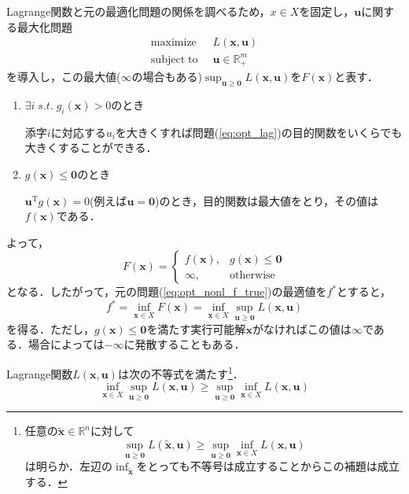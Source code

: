 \documentclass{jsreport}
\begin{document}
Lagrange関数と元の最適化問題の関係を調べるため，$x \in X$を固定し，$\bm{u}$に関する最大化問題
\begin{align}\label{eq:opt_lag}
  \mathrm{maximize} \; \; &L(\bm{x}, \bm{u}) \nonumber \\
  \mathrm{subject \; to} \; \; &\bm{u} \in \mathbb{R}_{+}^m
\end{align}
を導入し，この最大値($\infty$の場合もある)$\sup_{\bm{u} \geq \bm{0}} L(\bm{x}, \bm{u})$を$F(\bm{x})$と表す．
\begin{enumerate}
  \item $\exists i \; s.t. \; g_i(\bm{x}) > 0$のとき

  添字$i$に対応する$u_i$を大きくすれば問題(\ref{eq:opt_lag})の目的関数をいくらでも大きくすることができる．
  \item $g(\bm{x}) \leq \bm{0}$のとき

  $\bm{u}^{\mathrm{T}}g(\bm{x}) = 0$(例えば$\bm{u} = \bm{0}$)のとき，目的関数は最大値をとり，その値は$f(\bm{x})$である．
\end{enumerate}
よって，
\begin{equation}
  F(\bm{x}) = \begin{cases}
    f(\bm{x}), & g(\bm{x}) \leq \bm{0} \\
    \infty,        & \mathrm{otherwise}
\end{cases} \nonumber
\end{equation}
となる．したがって，元の問題(\ref{eq:opt_nonl_f_true})の最適値を$f^{*}$とすると，
\begin{equation}
  f^{*} = \inf_{\bm{x} \in X} F(\bm{x}) = \inf_{\bm{x} \in X} \sup_{\bm{u} \geq \bm{0}} L(\bm{x}, \bm{u}) \nonumber
\end{equation}
を得る．ただし，$g(\bm{x}) \leq \bm{0}$を満たす実行可能解$\bm{x}$がなければこの値は$\infty$である．場合によっては$-\infty$に発散することもある．

\begin{lemm}\label{lemm:infsup}
  Lagrange関数$L(\bm{x}, \bm{u})$は次の不等式を満たす\footnote{
  任意の$\tilde{\bm{x}} \in \mathbb{R}^n$に対して
  \begin{equation}
    \sup_{\bm{u} \geq \bm{0}} L(\tilde{\bm{x}}, \bm{u}) \geq \sup_{\bm{u} \geq \bm{0}} \inf_{\bm{x} \in X} L(\bm{x}, \bm{u}) \nonumber
  \end{equation}
  は明らか．左辺の$\inf_{\tilde{\bm{x}}}$をとっても不等号は成立することからこの補題は成立する．
  }．
  \begin{equation}
    \inf_{\bm{x} \in X} \sup_{\bm{u} \geq \bm{0}} L(\bm{x}, \bm{u}) \geq \sup_{\bm{u} \geq \bm{0}} \inf_{\bm{x} \in X} L(\bm{x}, \bm{u}) \nonumber
  \end{equation}
\end{lemm}
\end{document}
